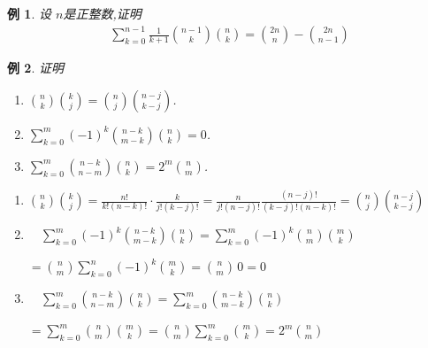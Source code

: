 \documentclass[punct]{ctexbeamer}
\newtheorem{ex}{例}[section]
\begin{document}
\begin{frame}
    \begin{ex}
        设 $n$是正整数,证明
        \begin{align*}
            \sum_{k=0}^{n-1}\frac{1}{k+1}\binom{n-1}{k}  \binom{n}{k}
            =\binom{2n}{n}- \binom{2n}{n-1}
        \end{align*}
    \end{ex}

\end{frame}



\begin{frame}
    \begin{ex}
        证明
        \begin{enumerate}
            \item $\binom{n}{k}\binom{k}{j}=\binom{n}{j} \binom{n-j}{k-j}$.

            \vspace{5pt}

            \item  $\sum\limits_{k=0}^{m}(-1)^{k}\binom{n-k}{m-k} \binom{n}{k}=0$.

            \vspace{5pt}

            \item  $\sum\limits_{k=0}^{m}\binom{n-k}{n-m}  \binom{n}{k}=2^{m}\binom{n}{m}$.
        \end{enumerate}
    \end{ex}

    \pause

    \begin{enumerate}
        \item
        $\binom{n}{k}\binom{k}{j}=\frac{n !}{k! (n-k) !} \cdot \frac{k}{j!(k-j) !}=\frac{n}{j!(n-j) !}\frac{(n-j) !}{ (k-j) !(n-k) !}=\binom{n}{j} \binom{n-j}{k-j}$
\vspace{6pt}

        \item
        $\quad
        \sum\limits_{k=0}^{m}(-1)^{k}\binom{n-k}{m-k} \binom{n}{k}
        = \sum\limits_{k=0}^{m}(-1)^{k}\binom{n}{m}\binom{m}{k} $

\vspace{4pt}

        $= \binom{n}{m} \sum\limits_{k=0}^{n}(-1)^{k}\binom{m}{k}
        = \binom{n}{m} \, 0=0
        $

\vspace{6pt}

        \item
        $\quad \sum\limits_{k=0}^{m}\binom{n-k}{n-m} \binom{n}{k}
        =\sum_{k=0}^{m}\binom{n-k}{m-k}\binom{n}{k}$

\vspace{4pt}

        $=\sum\limits_{k=0}^{m}\binom{n} {m}\binom{m}{k}
        =\binom{n}{ m}\sum\limits_{k=0}^{m}\binom{m}{k}=2^{m}\binom{n}{m}$
    \end{enumerate}

\end{frame}
\end{document}
